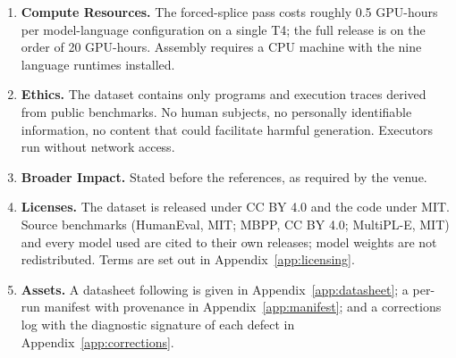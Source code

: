 \begin{enumerate}
\item \textbf{Compute Resources.} The forced-splice pass costs roughly 0.5 GPU-hours per
model-language configuration on a single T4; the full release is on the order of 20 GPU-hours.
Assembly requires a CPU machine with the nine language runtimes installed.

\item \textbf{Ethics.} The dataset contains only programs and execution traces derived from public
benchmarks. No human subjects, no personally identifiable information, no content that could
facilitate harmful generation. Executors run without network access.

\item \textbf{Broader Impact.} Stated before the references, as required by the venue.

\item \textbf{Licenses.} The dataset is released under CC BY 4.0 and the code under MIT. Source
benchmarks (HumanEval, MIT; MBPP, CC BY 4.0; MultiPL-E, MIT) and every model used are cited to
their own releases; model weights are not redistributed. Terms are set out in
Appendix~\ref{app:licensing}.

\item \textbf{Assets.} A datasheet following \citet{gebru2021datasheets} is given in
Appendix~\ref{app:datasheet}; a per-run manifest with provenance in Appendix~\ref{app:manifest}; and
a corrections log with the diagnostic signature of each defect in Appendix~\ref{app:corrections}.
\end{enumerate}
